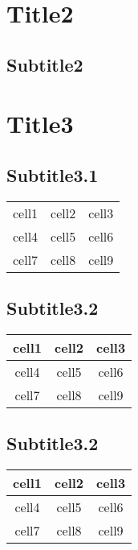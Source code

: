 \documentclass{uc3mpracticas}
\begin{document}
  \section{Title2}
  \subsection{Subtitle2}


  \section{Title3}
  \subsection{Subtitle3.1}


    \begin{center}
      \begin{tabular}{ c c c }
       cell1 & cell2 & cell3 \\
       cell4 & cell5 & cell6 \\
       cell7 & cell8 & cell9
      \end{tabular}
    \end{center}

  \subsection{Subtitle3.2}

    \begin{center}
      \begin{tabular}{ | c | c | c | }
        \hline
       cell1 & cell2 & cell3 \\
       \hline
       cell4 & cell5 & cell6 \\
       \hline
       cell7 & cell8 & cell9 \\
       \hline
      \end{tabular}
    \end{center}

  \subsection{Subtitle3.2}

    \begin{center}
      \begin{tabular}{  c | c | c  }

       cell1 & cell2 & cell3 \\
       \hline
       \hline
       cell4 & cell5 & cell6 \\
       cell7 & cell8 & cell9 \\
      \end{tabular}
    \end{center}
\end{document}
